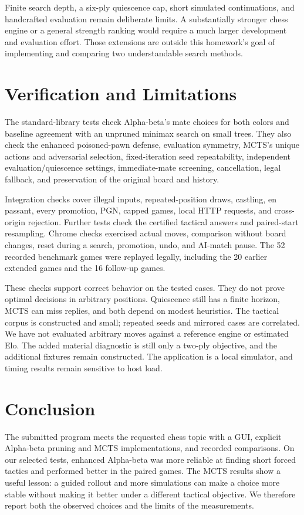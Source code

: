 \documentclass[oneside,final]{hcmut-report}
\begin{document}
Finite search depth, a six-ply quiescence cap, short simulated continuations,
and handcrafted evaluation remain deliberate limits. A substantially
stronger chess engine or a general strength ranking would require a much
larger development and evaluation effort. Those extensions are outside
this homework's goal of implementing and comparing two understandable
search methods.

\section{Verification and Limitations}
The standard-library tests check Alpha-beta's mate
choices for both colors and baseline agreement with an unpruned minimax
search on small trees. They also check the enhanced poisoned-pawn defense,
evaluation symmetry, MCTS's unique actions and adversarial selection,
fixed-iteration seed repeatability, independent evaluation/quiescence settings,
immediate-mate screening, cancellation, legal fallback, and
preservation of the original board and history.

Integration checks cover illegal inputs, repeated-position draws, castling,
en passant, every promotion, PGN, capped games, local HTTP requests, and
cross-origin rejection. Further tests check the certified tactical answers
and paired-start resampling. Chrome checks exercised actual moves,
comparison without board changes, reset during a search, promotion, undo,
and AI-match pause. The 52 recorded benchmark games were replayed legally,
including the 20 earlier extended games and the 16 follow-up games.

These checks support correct behavior on the tested cases. They do not
prove optimal decisions in arbitrary positions. Quiescence still has a
finite horizon, MCTS can miss replies, and both depend on modest heuristics.
The tactical corpus is constructed and small; repeated seeds and mirrored
cases are correlated. We have not evaluated arbitrary moves against a
reference engine or estimated Elo. The added material diagnostic is still
only a two-ply objective, and the additional fixtures remain constructed. The application is a local simulator,
and timing results remain sensitive to host load.

\section{Conclusion}
The submitted program meets the requested chess topic with a GUI, explicit
Alpha-beta pruning and MCTS implementations, and recorded comparisons.
On our selected tests, enhanced Alpha-beta was more reliable at finding
short forced tactics and performed better in the paired games. The MCTS
results show a useful lesson: a guided rollout and more simulations can
make a choice more stable without making it better under a different
tactical objective. We therefore report both the observed choices and
the limits of the measurements.
\end{document}
